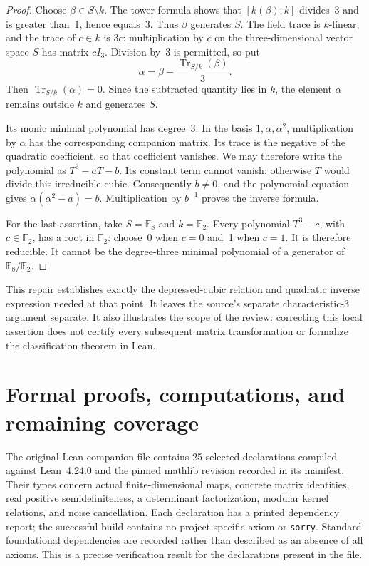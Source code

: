 \begin{proof}
Choose \(\beta\in S\setminus k\). The tower formula shows that
\([k(\beta):k]\) divides~3 and is greater than~1, hence equals~3.
Thus \(\beta\) generates \(S\). The field trace is \(k\)-linear,
and the trace of \(c\in k\) is \(3c\): multiplication by \(c\) on
the three-dimensional vector space \(S\) has matrix \(cI_3\).
Division by~3 is permitted, so put
\[
 \alpha=\beta-\frac{\operatorname{Tr}_{S/k}(\beta)}3.
\]
Then \(\operatorname{Tr}_{S/k}(\alpha)=0\). Since the subtracted
quantity lies in \(k\), the element \(\alpha\) remains outside
\(k\) and generates \(S\).

Its monic minimal polynomial has degree~3. In the basis
\(1,\alpha,\alpha^2\), multiplication by \(\alpha\) has the
corresponding companion matrix. Its trace is the negative of the
quadratic coefficient, so that coefficient vanishes. We may therefore
write the polynomial as \(T^3-aT-b\). Its constant term cannot vanish:
otherwise \(T\) would divide this irreducible cubic. Consequently
\(b\ne0\), and the polynomial equation gives
\(\alpha(\alpha^2-a)=b\). Multiplication by \(b^{-1}\) proves the
inverse formula.

For the last assertion, take \(S=\mathbb F_8\) and \(k=\mathbb F_2\).
Every polynomial \(T^3-c\), with \(c\in\mathbb F_2\), has a root in
\(\mathbb F_2\): choose~0 when \(c=0\) and~1 when \(c=1\).
It is therefore reducible. It cannot be the degree-three minimal
polynomial of a generator of \(\mathbb F_8/\mathbb F_2\).
\end{proof}

This repair establishes exactly the depressed-cubic relation and quadratic
inverse expression needed at that point. It leaves the source's separate
characteristic-3 argument separate. It also illustrates the scope of the
review: correcting this local assertion does not certify every subsequent
matrix transformation or formalize the classification theorem in Lean.

\section{Formal proofs, computations, and remaining coverage}

The original Lean companion file contains 25 selected declarations compiled against
Lean~4.24.0 and the pinned mathlib revision recorded in its manifest. Their
types concern actual finite-dimensional maps, concrete matrix identities,
real positive semidefiniteness, a determinant factorization, modular kernel
relations, and noise cancellation. Each declaration has a printed dependency
report; the successful build contains no project-specific axiom or
\texttt{sorry}. Standard foundational dependencies are recorded rather than
described as an absence of all axioms. This is a precise verification result
for the declarations present in the file.

